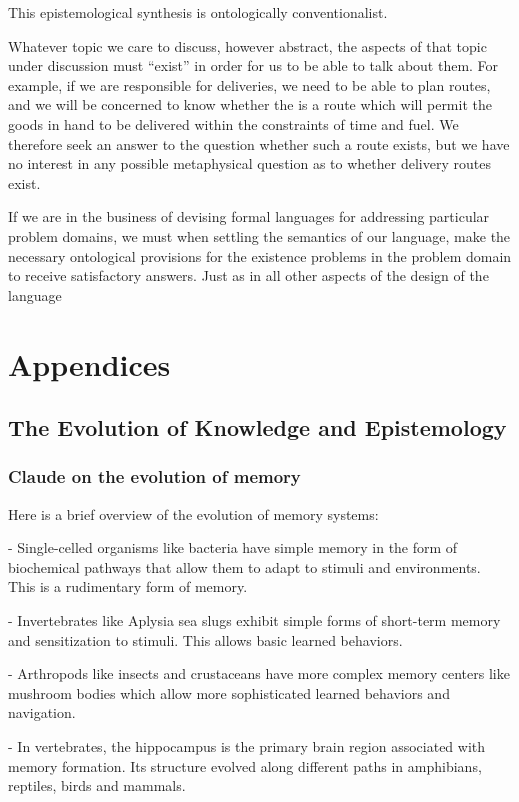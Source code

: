 \documentclass[10pt,titlepage]{book}
\begin{document}
This epistemological synthesis is ontologically conventionalist.

Whatever topic we care to discuss, however abstract, the aspects of that topic under discussion must ``exist'' in order for us to be able to talk about them.
For example, if we are responsible for deliveries, we need to be able to plan routes, and we will be concerned to know whether the is a route which will permit the goods in hand to be delivered within the constraints of time and fuel.
We therefore seek an answer to the question whether such a route exists, but we have no interest in any possible metaphysical question as to whether delivery routes exist.

If we are in the business of devising formal languages for addressing particular problem domains, we must when settling the semantics of our language, make the necessary ontological provisions for the existence problems in the problem domain to receive satisfactory answers.
Just as in all other aspects of the design of the language



\chapter{Appendices}

\section{The Evolution of Knowledge and Epistemology}

\subsection{Claude on the evolution of memory}

Here is a brief overview of the evolution of memory systems:

- Single-celled organisms like bacteria have simple memory in the form of biochemical pathways that allow them to adapt to stimuli and environments. This is a rudimentary form of memory.

- Invertebrates like Aplysia sea slugs exhibit simple forms of short-term memory and sensitization to stimuli. This allows basic learned behaviors.

- Arthropods like insects and crustaceans have more complex memory centers like mushroom bodies which allow more sophisticated learned behaviors and navigation. 

- In vertebrates, the hippocampus is the primary brain region associated with memory formation. Its structure evolved along different paths in amphibians, reptiles, birds and mammals.
\end{document}

